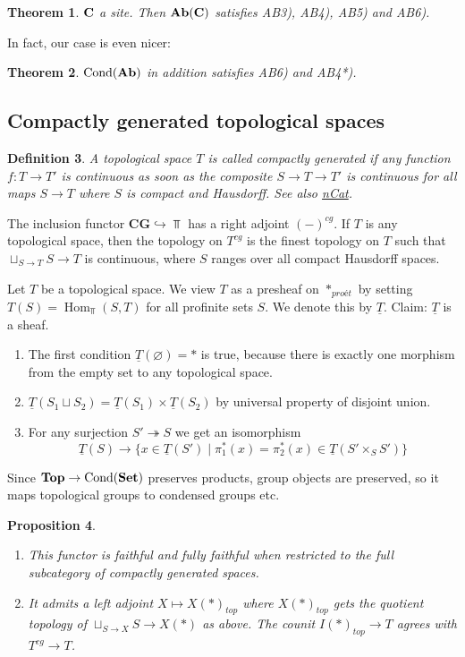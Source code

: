 \documentclass[A4paper, british]{amsart}
\theoremstyle{darkgreentheorem}
\newtheorem{thm}{Theorem}[section]
\newtheorem{prop}[thm]{Proposition}
\theoremstyle{darkbluedefinition}
\newtheorem{defn}[thm]{Definition}
\theoremstyle{darkredexample}
\theoremstyle{remark}
\DeclareMathOperator{\Hom}{Hom}
\DeclareMathOperator{\Cond}{Cond}
\newcommand{\CG}{\mathbf{CG}}
\newcommand{\1}{\mathbbm{1}}
\newcommand{\pe}{*_{proét}}
\renewcommand{\u}[1]{\underline{#1}}
\newcommand{\fp}[1]{\times_{#1}}
\begin{document}
\begin{thm}
    $\mathbf{C}$ a site. Then $\mathbf{Ab}(\mathbf{C})$ satisfies AB3), AB4), AB5) and AB6).
\end{thm}

In fact, our case is even nicer:

\begin{thm}
    $\Cond(\Ab)$ in addition satisfies AB6) and AB4*).
\end{thm}

\subsection{Compactly generated topological spaces}

\begin{defn}
    A topological space $T$ is called \textit{compactly generated} if any function $f\colon T\to T'$ is continuous as soon as the composite $S\to T\to T'$ is continuous for all maps $S\to T$ where $S$ is compact and Hausdorff.
    See also \href{https://ncatlab.org/nlab/show/compactly+generated+topological+space}{nCat}.
\end{defn}

The inclusion functor $\CG \hookrightarrow \Top$ has a right adjoint $(-)^{cg}$.
If $T$ is any topological space, then the topology on $T^{cg}$ is the finest topology on $T$ such that $\sqcup_{S\to T}S\to T$ is continuous, where $S$ ranges over all compact Hausdorff spaces.

Let $T$ be a topological space.
We view $T$ as a presheaf on $\pe$ by setting $T(S)=\Hom_{\Top}(S,T)$ for all profinite sets $S$.
We denote this by $\u{T}$.
Claim: $\u{T}$ is a sheaf.
\begin{enumerate}[label=\roman*)]
    \item The first condition $\u{T}(\varnothing)=*$ is true, because there is exactly one morphism from the empty set to any topological space.
    \item $\u{T}(S_{1}\sqcup S_{2})=\u{T}(S_{1})\times \u{T}(S_{2})$ by universal property of disjoint union.
    \item For any surjection $S'\twoheadrightarrow S$ we get an isomorphism
	\[ \u{T}(S)\to \{ x\in \u{T}(S')\mid \pi_{1}^{*}(x)=\pi_{2}^{*}(x)\in \u{T}(S'\fp{S}S')\}\]
\end{enumerate}

Since $\Top\to \Cond(\Set)$ preserves products, group objects are preserved, so it maps topological groups to condensed groups etc.

\begin{prop}
    \begin{enumerate}[label=\roman*)]
	\item This functor is faithful and fully faithful when restricted to the full subcategory of compactly generated spaces.
	\item It admits a left adjoint $X\mapsto X(*)_{top}$ where $X(*)_{top}$ gets the quotient topology of $\sqcup_{S\to X}S\to X(*)$ as above.
	    The counit $I(*)_{top}\to T$ agrees with $T^{cg}\to T$.
    \end{enumerate}
\end{prop}
\end{document}
